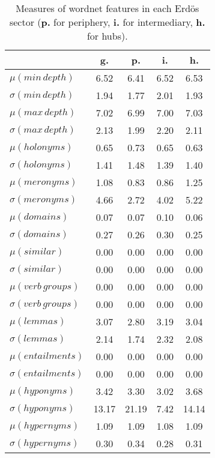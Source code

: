 

\begin{table}[h!]
\begin{center}
\begin{tabular}{| l || c | c | c | c |}\hline
 & {\bf g.} & {\bf p.} & {\bf i.} & {\bf h.} \\\hline\hline
$\mu(min\,depth)$ & 6.52  & 6.41  & 6.52  & 6.53 \\
$\sigma(min\,depth)$ & 1.94  & 1.77  & 2.01  & 1.93 \\\hline
$\mu(max\,depth)$ & 7.02  & 6.99  & 7.00  & 7.03 \\
$\sigma(max\,depth)$ & 2.13  & 1.99  & 2.20  & 2.11 \\\hline
$\mu(holonyms)$ & 0.65  & 0.73  & 0.65  & 0.63 \\
$\sigma(holonyms)$ & 1.41  & 1.48  & 1.39  & 1.40 \\\hline
$\mu(meronyms)$ & 1.08  & 0.83  & 0.86  & 1.25 \\
$\sigma(meronyms)$ & 4.66  & 2.72  & 4.02  & 5.22 \\\hline
$\mu(domains)$ & 0.07  & 0.07  & 0.10  & 0.06 \\
$\sigma(domains)$ & 0.27  & 0.26  & 0.30  & 0.25 \\\hline
$\mu(similar)$ & 0.00  & 0.00  & 0.00  & 0.00 \\
$\sigma(similar)$ & 0.00  & 0.00  & 0.00  & 0.00 \\\hline
$\mu(verb\,groups)$ & 0.00  & 0.00  & 0.00  & 0.00 \\
$\sigma(verb\,groups)$ & 0.00  & 0.00  & 0.00  & 0.00 \\\hline
$\mu(lemmas)$ & 3.07  & 2.80  & 3.19  & 3.04 \\
$\sigma(lemmas)$ & 2.14  & 1.74  & 2.32  & 2.08 \\\hline
$\mu(entailments)$ & 0.00  & 0.00  & 0.00  & 0.00 \\
$\sigma(entailments)$ & 0.00  & 0.00  & 0.00  & 0.00 \\\hline
$\mu(hyponyms)$ & 3.42  & 3.30  & 3.02  & 3.68 \\
$\sigma(hyponyms)$ & 13.17  & 21.19  & 7.42  & 14.14 \\\hline
$\mu(hypernyms)$ & 1.09  & 1.09  & 1.08  & 1.09 \\
$\sigma(hypernyms)$ & 0.30  & 0.34  & 0.28  & 0.31 \\\hline
\end{tabular}
\caption{Measures of wordnet features in each Erd\"os sector ({{\bf p.}} for periphery, {{\bf i.}} for intermediary, {{\bf h.}} for hubs).}
\end{center}
\end{table}
